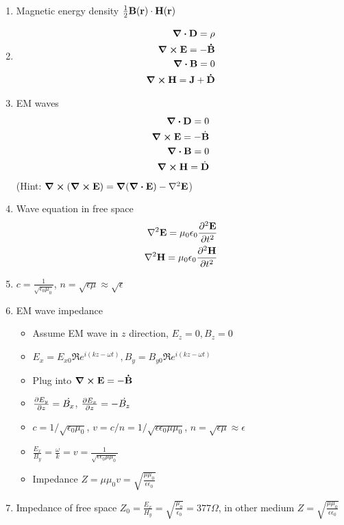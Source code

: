 \documentclass{article}
\theoremstyle{remark}
\theoremstyle{remark}
\begin{document}
\begin{enumerate}
    \item Magnetic energy density $\frac{1}{2}\vb{B}(\vb{r})\cdot\vb{H}(\vb{r})$
    \item \begin{align*}
        \div\vb{D}=\rho\\
        \curl\vb{E}=-\vb{\dot B}\\
        \div\vb{B}=0\\
        \curl\vb{H}=\vb{J}+\vb{\dot D}
    \end{align*}
    \item EM waves \begin{align*}\div\vb{D}=0\\
            \curl\vb{E}=-\dot{\vb{B}}\\
            \div\vb{B}=0\\
            \curl\vb{H}=\dot{\vb{D}}
    \end{align*} (Hint: $\curl(\curl\vb{E})=\grad(\div\vb{E})-\laplacian{\vb{E}}$)
    \item Wave equation in free space\begin{align*}
        \laplacian\vb{E}=\mu_0\epsilon_0\pdv[2]{\vb{E}}{t}\\
        \laplacian\vb{H}=\mu_0\epsilon_0\pdv[2]{\vb{H}}{t}
    \end{align*}
    \item $c=\frac{1}{\sqrt{\epsilon_0\mu_0}}$, $n=\sqrt{\epsilon\mu}\approx\sqrt{\epsilon}$
    \item EM wave impedance \begin{itemize}
        \item Assume EM wave in $z$ direction, $E_z=0, B_z=0$
        \item $E_x=E_{x0}\Re{e^{i(kz-\omega t)}}, B_y=B_{y0}\Re{e^{i(kz-\omega t)}}$
        \item Plug into $\curl\vb{E}=-\vb{\dot B}$
        \item $\pdv{E_y}{z}=\dot{B_x}$, $\pdv{E_x}{z}=-\dot{B_z}$
        \item $c=1/\sqrt{\epsilon_0\mu_0}$, $v=c/n=1/\sqrt{\epsilon\epsilon_0\mu\mu_0}$, $n=\sqrt{\epsilon\mu}\approx\epsilon$
        \item $\boxed{\frac{E_x}{B_y}=\frac{\omega}{k}=v=\frac{1}{\sqrt{\epsilon\epsilon_0\mu\mu_0}}}$
        \item Impedance $Z=\mu\mu_0 v=\sqrt{\frac{\mu\mu_0}{\epsilon\epsilon_0}}$
    \end{itemize}
    \item Impedance of free space $\boxed{Z_0=\frac{E_x}{H_y}}=\sqrt{\frac{\mu_0}{\epsilon_0}}=377\Omega$, in other medium $Z=\sqrt{\frac{\mu\mu_0}{\epsilon\epsilon_0}}$

\end{enumerate}
\end{document}
